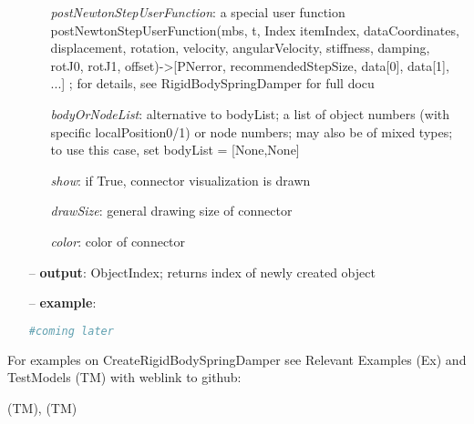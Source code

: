 \begin{itemize}[leftmargin=0.7cm]
\begin{itemize}[leftmargin=1.2cm]
\item[]{\it postNewtonStepUserFunction}: a special user function postNewtonStepUserFunction(mbs, t, Index itemIndex, dataCoordinates, displacement, rotation, velocity, angularVelocity, stiffness, damping, rotJ0, rotJ1, offset)->[PNerror, recommendedStepSize, data[0], data[1], ...] ; for details, see RigidBodySpringDamper for full docu
\item[]{\it bodyOrNodeList}: alternative to bodyList; a list of object numbers (with specific localPosition0/1) or node numbers; may also be of mixed types; to use this case, set bodyList = [None,None]
\item[]{\it show}: if True, connector visualization is drawn
\item[]{\it drawSize}: general drawing size of connector
\item[]{\it color}: color of connector
\end{itemize}
\item[--]
{\bf output}: ObjectIndex; returns index of newly created object
\item[--]
{\bf example}: \vspace{-12pt}\ei\begin{lstlisting}[language=Python, xleftmargin=36pt]
  #coming later
\end{lstlisting}\vspace{-24pt}\bi\item[]\vspace{-24pt}\vspace{12pt}\end{itemize}
%

%
\noindent For examples on CreateRigidBodySpringDamper see Relevant Examples (Ex) and TestModels (TM) with weblink to github:
\bi
 \item \footnotesize {} (TM), 
 (TM)
\ei

